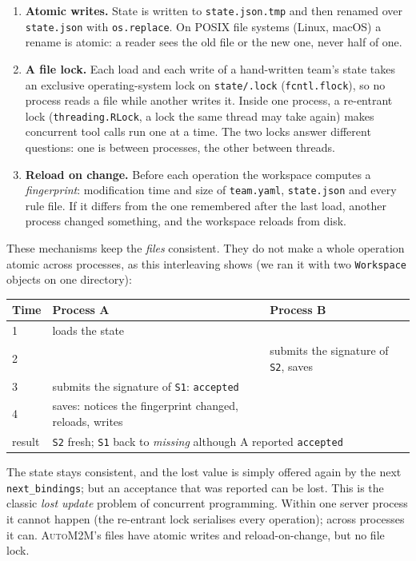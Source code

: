 \documentclass[10pt,a4paper]{article}
\newcommand{\auto}{\textsc{AutoM2M}}
\newcommand{\code}[1]{\texttt{#1}}
\newcommand{\file}[1]{\texttt{#1}}
\newcommand{\mcptool}[1]{\texttt{#1}}
\begin{document}
\begin{enumerate}
\item \textbf{Atomic writes.} State is written to \file{state.json.tmp} and
then renamed over \file{state.json} with \code{os.replace}. On POSIX file
systems (Linux, macOS) a rename is atomic: a reader sees the old file or the
new one, never half of one.
\item \textbf{A file lock.} Each load and each write of a hand-written
team's state takes an exclusive operating-system lock on
\file{state/.lock} (\code{fcntl.flock}), so no process reads a file while
another writes it. Inside one process, a re-entrant lock
(\code{threading.RLock}, a lock the same thread may take again) makes
concurrent tool calls run one at a time. The two locks answer different
questions: one is between processes, the other between threads.
\item \textbf{Reload on change.} Before each operation the workspace
computes a \emph{fingerprint}: modification time and size of
\file{team.yaml}, \file{state.json} and every rule file. If it differs from
the one remembered after the last load, another process changed something,
and the workspace reloads from disk.
\end{enumerate}

These mechanisms keep the \emph{files} consistent. They do not make a
whole operation atomic across processes, as this interleaving shows
(we ran it with two \code{Workspace} objects on one directory):

\begin{center}
\small
\begin{tabular}{@{}l l l@{}}
\toprule
Time & Process A & Process B \\
\midrule
1 & loads the state & \\
2 & & submits the signature of \code{S2}, saves \\
3 & submits the signature of \code{S1}: \code{accepted} & \\
4 & saves: notices the fingerprint changed, reloads, writes & \\
\midrule
result & \multicolumn{2}{l}{\code{S2} fresh; \code{S1} back to \emph{missing} although A reported \code{accepted}} \\
\bottomrule
\end{tabular}
\end{center}

The state stays consistent, and the lost value is simply offered again by
the next \mcptool{next\_bindings}; but an acceptance that was reported can
be lost. This is the classic \emph{lost update} problem of concurrent
programming. Within one server process it cannot happen (the re-entrant lock
serialises every operation); across processes it can. \auto{}'s files have
atomic writes and reload-on-change, but no file lock.
\end{document}
